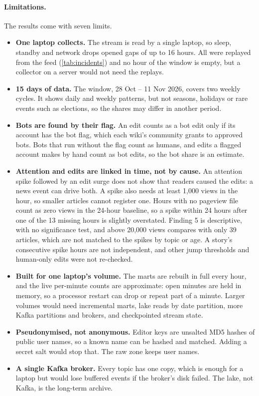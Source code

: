 \paragraph{Limitations.} The results come with seven limits.
\begin{itemize}
  \item \textbf{One laptop collects.} The stream is read by a single laptop, so sleep, standby and network
    drops opened gaps of up to 16 hours. All were replayed from the feed (\cref{tab:incidents}) and no
    hour of the window is empty, but a collector on a server would not need the replays.
  \item \textbf{15 days of data.} The window, 28 Oct -- 11 Nov 2026, covers two weekly cycles. It shows
    daily and weekly patterns, but not seasons, holidays or rare events such as elections, so the shares
    may differ in another period.
  \item \textbf{Bots are found by their flag.} An edit counts as a bot edit only if its account has the
    bot flag, which each wiki's community grants to approved bots. Bots that run without the flag count as
    humans, and edits a flagged account makes by hand count as bot edits, so the bot share is an estimate.
  \item \textbf{Attention and edits are linked in time, not by cause.} An attention spike followed by an
    edit surge does not show that readers caused the edits: a news event can drive both. A spike also
    needs at least 1{,}000 views in the hour, so smaller articles cannot register one. Hours with no pageview file count as zero views in the
    24-hour baseline, so a spike within 24 hours after one of the 13 missing hours is slightly overstated.
    Finding 5 is descriptive, with no significance test, and above 20{,}000 views compares with only 39 articles,
    which are not matched to the spikes by topic or age. A story's consecutive spike hours are not
    independent, and other jump thresholds and human-only edits were not re-checked.
  \item \textbf{Built for one laptop's volume.} The marts are rebuilt in full every hour, and the live
    per-minute counts are approximate: open minutes are held in memory, so a processor restart can drop
    or repeat part of a minute. Larger volumes would need incremental marts, lake reads by date
    partition, more Kafka partitions and brokers, and checkpointed stream state.
  \item \textbf{Pseudonymised, not anonymous.} Editor keys are unsalted MD5 hashes of public user names,
    so a known name can be hashed and matched. Adding a secret salt would stop that. The raw zone keeps
    user names.
  \item \textbf{A single Kafka broker.} Every topic has one copy, which is enough for a laptop but would
    lose buffered events if the broker's disk failed. The lake, not Kafka, is the long-term archive.
\end{itemize}


